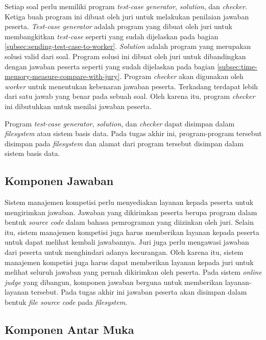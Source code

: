 \par Setiap soal perlu memiliki program \textit{test-case generator}, \textit{solution}, dan \textit{checker}. Ketiga buah program ini dibuat oleh juri untuk melakukan penilaian jawaban peserta. \textit{Test-case generator} adalah program yang dibuat oleh juri untuk membangkitkan \textit{test-case} seperti yang sudah dijelaskan pada bagian \ref{subsec:sending-test-case-to-worker}. \textit{Solution} adalah program yang merupakan solusi valid dari soal. Program solusi ini dibuat oleh juri untuk dibandingkan dengan jawaban peserta seperti yang sudah dijelaskan pada bagian \ref{subsec:time-memory-measure-compare-with-jury}. Program \textit{checker} akan digunakan oleh \textit{worker} untuk menentukan kebenaran jawaban peserta. Terkadang terdapat lebih dari satu jawab yang benar pada sebuah soal. Oleh karena itu, program \textit{checker} ini dibutuhkan untuk menilai jawaban peserta. 

\par Program \textit{test-case generator}, \textit{solution}, dan \textit{checker} dapat disimpan dalam \textit{filesystem} atau sistem basis data. Pada tugas akhir ini, program-program tersebut disimpan pada \textit{filesystem} dan alamat dari program tersebut disimpan dalam sistem basis data.

\subsection{Komponen Jawaban}

\par Sistem manajemen kompetisi perlu menyediakan layanan kepada peserta untuk mengirimkan jawaban. Jawaban yang dikirimkan peserta berupa program dalam bentuk \textit{source code} dalam bahasa pemrograman yang diizinkan oleh juri. Selain itu, sistem manajemen kompetisi juga harus memberikan layanan kepada peserta untuk dapat melihat kembali jawabannya. Juri juga perlu mengawasi jawaban dari peserta untuk menghindari adanya kecurangan.  Oleh karena itu, sistem manajemen kompetisi juga harus dapat memberikan layanan kepada juri untuk melihat seluruh jawaban yang pernah dikirimkan oleh peserta. Pada sistem \textit{online judge} yang dibangun, komponen jawaban berguna untuk memberikan layanan-layanan tersebut. Pada tugas akhir ini jawaban peserta akan disimpan dalam bentuk \textit{file source code} pada \textit{filesystem}.

\subsection{Komponen Antar Muka}

